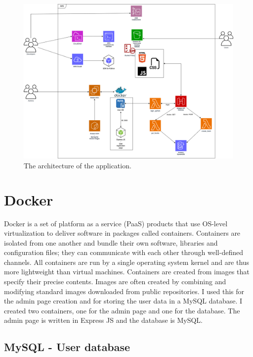 \documentclass[11pt,a4paper,oneside]{report}
\begin{document}
\begin{figure}[!ht]
  \centering
  \includegraphics[scale=0.23]{aws.drawio.png}
  \caption{The architecture of the application.}
  \label{fig:TexnicCenter}
\end{figure}

\section{Docker}

Docker is a set of platform as a service (PaaS) products that use OS-level virtualization to deliver software in packages called containers. Containers are isolated from one another and bundle their own software, libraries and configuration files; they can communicate with each other through well-defined channels. All containers are run by a single operating system kernel and are thus more lightweight than virtual machines. Containers are created from images that specify their precise contents. Images are often created by combining and modifying standard images downloaded from public repositories. \cite{docker}
I used this for the admin page creation and for storing the user data in a MySQL database. I created two containers, one for the admin page and one for the database. The admin page is written in Express JS and the database is MySQL.

\subsection{MySQL - User database}
\end{document}
